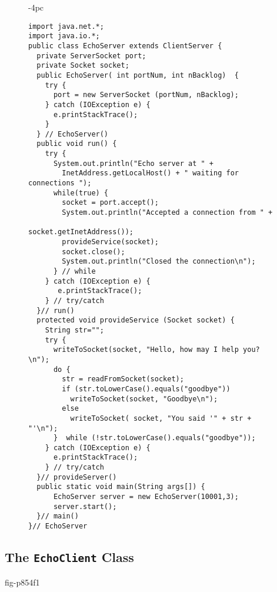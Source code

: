 {\begin{figure}[p]
\jjjprogstart
\begin{jjjlistingleft}[30pc]{-4pc}
\begin{lstlisting}
import java.net.*;
import java.io.*;
public class EchoServer extends ClientServer {
  private ServerSocket port;
  private Socket socket;
  public EchoServer( int portNum, int nBacklog)  {
    try {
      port = new ServerSocket (portNum, nBacklog);
    } catch (IOException e) {
      e.printStackTrace();
    }
  } // EchoServer()
  public void run() {
    try {
      System.out.println("Echo server at " + 
        InetAddress.getLocalHost() + " waiting for connections ");
      while(true) {
        socket = port.accept();
        System.out.println("Accepted a connection from " + 
                                        socket.getInetAddress());
        provideService(socket);
        socket.close();
        System.out.println("Closed the connection\n");
      } // while
    } catch (IOException e) {
       e.printStackTrace();
    } // try/catch
  }// run()
  protected void provideService (Socket socket) {
    String str="";
    try {
      writeToSocket(socket, "Hello, how may I help you?\n");
      do {
        str = readFromSocket(socket);
        if (str.toLowerCase().equals("goodbye"))
          writeToSocket(socket, "Goodbye\n");
        else
          writeToSocket( socket, "You said '" + str + "'\n");
      }  while (!str.toLowerCase().equals("goodbye"));
    } catch (IOException e) {
      e.printStackTrace();
    } // try/catch
  }// provideServer()
  public static void main(String args[]) {
      EchoServer server = new EchoServer(10001,3);
      server.start();
  }// main()
}// EchoServer
\end{lstlisting}
\end{jjjlistingleft}
\end{figure}

\pagebreak
\subsection{The {\tt EchoClient} Class}


{fig-p854f1}

}
